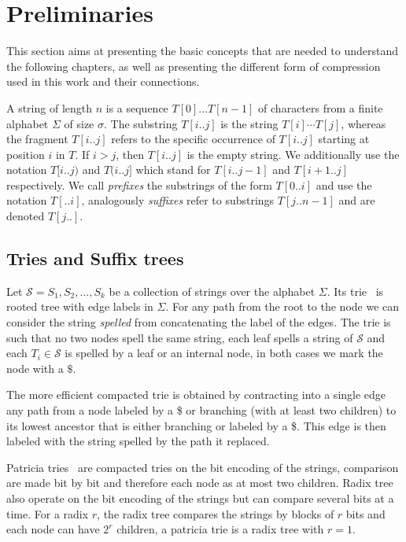 \section{Preliminaries}\label{sec:prelim}


This section aims at presenting the basic concepts that are needed to understand the following chapters, as well as presenting the different form of compression used in this work and their connections.

A string of length $n$ is a sequence $T[0] \dots T[n-1]$ of characters from a finite alphabet $\Sigma$ of size $\sigma$. The substring $T[i..j]$ is the string $T[i] \cdots T[j]$, whereas the fragment $T[i..j]$ refers to the specific occurrence of $T[i..j]$ starting at position $i$ in $T$. If $i > j$, then $T[i..j]$ is the empty string. We additionally use the notation $T[i..j)$ and $T(i..j]$ which stand for $T[i..j-1]$ and $T[i+1..j]$ respectively. We call \emph{prefixes} the substrings of the form $T[0..i]$ and use the notation $T[..i]$, analogously \emph{suffixes} refer to substrings $T[j..n-1]$ and are denoted $T[j..]$.

\subsection{Tries and Suffix trees}

Let $\mathcal{S} = {S_1,S_2, ..., S_k}$ be a collection of strings over the alphabet $\Sigma$. Its trie~\cite{thue1912gegenseitige,de1959file,fredkin1960trie} is rooted tree with edge labels in $\Sigma$.
For any path from the root to the node we can consider the string \emph{spelled} from concatenating the label of the edges. The trie is such that no two nodes spell the same string, each leaf spells a string of $\mathcal{S}$ and each $T_i \in \mathcal{S}$ is spelled by a leaf or an internal node, in both cases we mark the node with a $\$ $.

The more efficient compacted trie is obtained by contracting  into a single edge any path from a node labeled by a \$ or branching (with at least two children) to its lowest ancestor that is either branching or labeled by a \$.
This edge is then labeled with the string spelled by the path it replaced.

Patricia tries~\cite{morrison1968patricia} are compacted tries on the bit encoding of the strings, comparison are made bit by bit and therefore each node as at most two children. Radix tree also operate on the bit encoding of the strings but can compare several bits at a time. For a radix $r$, the radix tree compares the strings by blocks of $r$ bits and each node can have $2^r$ children, a patricia trie is a radix tree with $r=1$.

